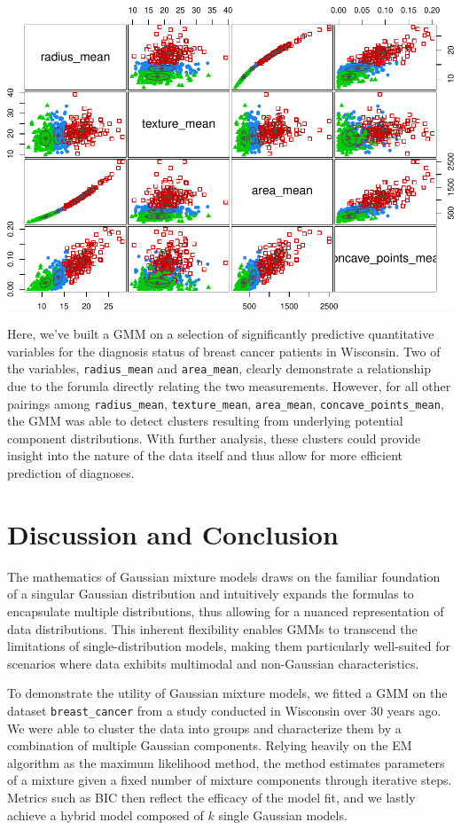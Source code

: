 \documentclass[12pt]{article}
\begin{document}
\includegraphics{CassieJin_FinalPaper_files/figure-latex/unnamed-chunk-11-1.pdf}

Here, we've built a GMM on a selection of significantly predictive
quantitative variables for the diagnosis status of breast cancer
patients in Wisconsin. Two of the variables, \texttt{radius\_mean} and
\texttt{area\_mean}, clearly demonstrate a relationship due to the
forumla directly relating the two measurements. However, for all other
pairings among \texttt{radius\_mean}, \texttt{texture\_mean},
\texttt{area\_mean}, \texttt{concave\_points\_mean}, the GMM was able to
detect clusters resulting from underlying potential component
distributions. With further analysis, these clusters could provide
insight into the nature of the data itself and thus allow for more
efficient prediction of diagnoses.

\hypertarget{discussion-and-conclusion}{%
\section{Discussion and Conclusion}\label{discussion-and-conclusion}}

The mathematics of Gaussian mixture models draws on the familiar
foundation of a singular Gaussian distribution and intuitively expands
the formulas to encapsulate multiple distributions, thus allowing for a
nuanced representation of data distributions. This inherent flexibility
enables GMMs to transcend the limitations of single-distribution models,
making them particularly well-suited for scenarios where data exhibits
multimodal and non-Gaussian characteristics.

To demonstrate the utility of Gaussian mixture models, we fitted a GMM
on the dataset \texttt{breast\_cancer} from a study conducted in
Wisconsin over 30 years ago. We were able to cluster the data into
groups and characterize them by a combination of multiple Gaussian
components. Relying heavily on the EM algorithm as the maximum
likelihood method, the method estimates parameters of a mixture given a
fixed number of mixture components through iterative steps. Metrics such
as BIC then reflect the efficacy of the model fit, and we lastly achieve
a hybrid model composed of \(k\) single Gaussian models.
\end{document}

